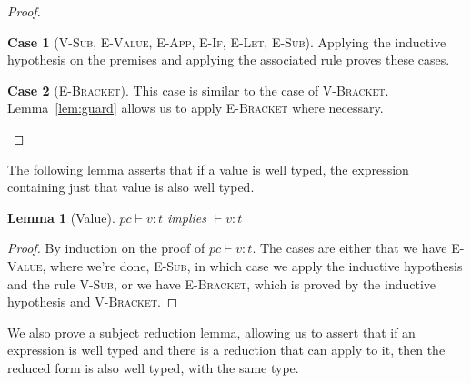 \documentclass[a4paper,twocolumn]{article}
\newcommand{\typeRule}[3]{#1 \vdash #2 \colon #3}
\theoremstyle{plain}
\newtheorem{lemma}{Lemma}
\theoremstyle{definition}
\newtheorem*{case}{Case}
\begin{document}
\begin{proof}
  \begin{case}[\textsc{V-Sub}, \textsc{E-Value}, \textsc{E-App}, \textsc{E-If},
    \textsc{E-Let}, \textsc{E-Sub}]
    Applying the inductive hypothesis on the premises and applying the
    associated rule proves these cases.
  \end{case}

  \begin{case}[\textsc{E-Bracket}]
    This case is similar to the case of \textsc{V-Bracket}.
    Lemma~\ref{lem:guard} allows us to apply \textsc{E-Bracket} where necessary.
  \end{case}
\end{proof}

The following lemma asserts that if a value is well typed, the expression
containing just that value is also well typed.

\begin{lemma}[Value]
  \label{lem:value}
  $\typeRule{pc}{v}{t}$ implies $\typeRule{ }{v}{t}$
\end{lemma}
\begin{proof}
  By induction on the proof of $\typeRule{pc}{v}{t}$.  The cases are either that
  we have \textsc{E-Value}, where we're done, \textsc{E-Sub}, in which case we
  apply the inductive hypothesis and the rule \textsc{V-Sub}, or we have
  \textsc{E-Bracket}, which is proved by the inductive hypothesis and
  \textsc{V-Bracket}.
\end{proof}

We also prove a subject reduction lemma, allowing us to assert that if an
expression is well typed and there is a reduction that can apply to it, then the
reduced form is also well typed, with the same type.
\end{document}
